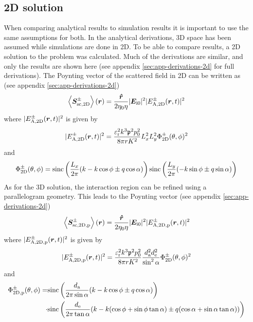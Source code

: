 \documentclass[11pt,twoside]{eitExjobb}
\begin{document}
	\subsection{2D solution}
	When comparing analytical results to simulation results it is important to use the same assumptions for both. In the analytical derivations, 3D space has been assumed while simulations are done in 2D. To be able to compare results, a 2D solution to the problem was calculated. Much of the derivations are similar, and only the results are shown here (see appendix \ref{sec:app-derivations-2d} for full derivations). The Poynting vector of the scattered field in 2D can be written as (see appendix \ref{sec:app-derivations-2d})
	\begin{equation}
		\left< \bm{S}_{\mathrm{sc,2D}}^\pm \right> (\bm{r}) = \frac{\bm{\hat{r}}}{2\eta_0 \eta} |\bm{E}_{\mathrm{i}0}|^2 |E_{\mathrm{A,2D}}^\pm (\bm{r},t)|^2
		\label{eq:an-2d-power-cuboid}
	\end{equation}
	where $|E_{\mathrm{A,2D}}^\pm (\bm{r},t)|^2$ is given by
	\begin{equation*}
		|E_{\mathrm{A,2D}}^\pm (\bm{r},t)|^2 = \frac{\varepsilon_{\mathrm{r}}^2 k^3 \mathfrak{p}^2 p_0^2}{8\pi r K^2} L_{x}^2 L_{y}^2 \Phi_{\mathrm{2D}}^\pm (\theta,\phi)^2
	\end{equation*}
	and
	\begin{equation*}
		\Phi_{\mathrm{2D}}^\pm (\theta,\phi) = \text{sinc} \left( \frac{L_{x}}{2\pi} ( k - k\cos{\phi} \pm q\cos{\alpha} ) \right) \text{sinc} \left( \frac{L_{y}}{2\pi} ( - k\sin{\phi} \pm q\sin{\alpha} ) \right)
	\end{equation*}
	As for the 3D solution, the interaction region can be refined using a parallelogram geometry. This leads to the Poynting vector (see appendix \ref{sec:app-derivations-2d})
	\begin{equation}
		\left< \bm{S}_{\mathrm{sc,2D,p}}^\pm \right> (\bm{r}) = \frac{\bm{\hat{r}}}{2\eta_0 \eta} |\bm{E}_{\mathrm{i}0}|^2 |E_{\mathrm{A,2D,p}}^\pm (\bm{r},t)|^2
		\label{eq:an-2d-power-parallelogram}
	\end{equation}
	where $|E_{\mathrm{A,2D,p}}^\pm (\bm{r},t)|^2$ is given by
	\begin{equation*}
		|E_{\mathrm{A,2D,p}}^\pm (\bm{r},t)|^2 = \frac{\varepsilon_{\mathrm{r}}^2 k^3 \mathfrak{p}^2 p_0^2}{8\pi r K^2} \frac{d_{\mathrm{a}}^2 d_{\mathrm{e}}^2}{\sin^2{\alpha}} \Phi_{\mathrm{2D}}^\pm (\theta,\phi)^2
	\end{equation*}
	and
	\begin{equation*}
	\begin{split}
		\Phi_{\mathrm{2D,p}}^\pm (\theta,\phi) = &\text{sinc}\left( \frac{d_{\mathrm{a}}}{2\pi \sin{\alpha}}(k - k\cos{\phi} \pm q\cos{\alpha}) \right) \\
		\cdot &\text{sinc}\left( \frac{d_{\mathrm{e}}}{2\pi \tan{\alpha}}
		(k - k(\cos{\phi} + \sin{\phi}\tan{\alpha}) \pm q(\cos{\alpha} + \sin{\alpha}\tan{\alpha})) \right)
	\end{split}
	\end{equation*}
	
\end{document}
